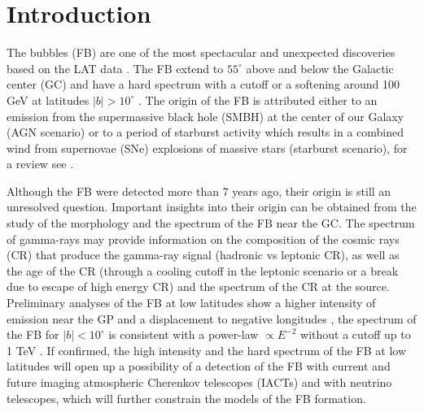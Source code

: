 \section{Introduction}



The \Fermi bubbles (FB) are one of the most spectacular and unexpected discoveries based on the \Fermi LAT data
\citep{2010ApJ...724.1044S}.
The FB extend to $55^\circ$ above and below the Galactic center (GC)
and have a hard spectrum with a cutoff or a softening around 100 GeV at latitudes $|b| > 10^\circ$ \citep{2014ApJ...793...64A}.
The origin of the FB is attributed either to an emission from the supermassive black hole (SMBH) at
the center of our Galaxy (AGN scenario)
or to a period of starburst activity which results in a combined wind
from supernovae (SNe) explosions of massive stars (starburst scenario),  for a review see \cite{2010ApJ...711..818S}.

Although the FB were detected more than 7 years ago, their origin is still an unresolved question.
Important insights into their origin can be obtained from the study of the morphology and the spectrum of the FB near the GC.
The spectrum of gamma-rays may provide information on the composition of the 
cosmic rays (CR) that produce the gamma-ray signal (hadronic vs leptonic CR),
as well as the age of the CR (through a cooling cutoff in the leptonic scenario or a break due to escape of high energy CR)
and the spectrum of the CR at the source.
Preliminary analyses of the FB at low latitudes show a higher intensity of emission near the GP and a displacement
to negative longitudes \citep{2016ApJS..223...26A, 2017ApJ...840...43A},
the spectrum of the FB for $|b| < 10^\circ$ is consistent with a power-law $\propto E^{-2}$ 
without a cutoff up to 1 TeV \citep{2017ApJ...840...43A}.
If confirmed, the high intensity and the hard spectrum
of the FB at low latitudes will open up a possibility of a detection of the FB with current and future imaging atmospheric Cherenkov telescopes (IACTs)
and with neutrino telescopes, which will further constrain the models of the FB formation.

